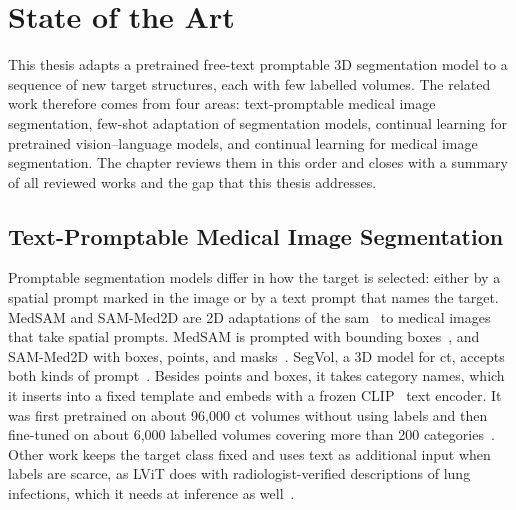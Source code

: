 %
%

\chapter{State of the Art}
\label{chap:sota}

This thesis adapts a pretrained free-text promptable 3D segmentation model to a sequence of new target structures, each with few labelled volumes.
The related work therefore comes from four areas: text-promptable medical image segmentation, few-shot adaptation of segmentation models, continual learning for pretrained vision--language models, and continual learning for medical image segmentation.
The chapter reviews them in this order and closes with a summary of all reviewed works and the gap that this thesis addresses.

\section{Text-Promptable Medical Image Segmentation}
\label{sec:text-promptable-seg}

Promptable segmentation models differ in how the target is selected: either by a spatial prompt marked in the image or by a text prompt that names the target.
MedSAM and SAM-Med2D are 2D adaptations of the \gls{sam}~\cite{Kirillov_2023_ICCV} to medical images that take spatial prompts.
MedSAM is prompted with bounding boxes~\cite{Ma_2024}, and SAM-Med2D with boxes, points, and masks~\cite{cheng2023sammed2d}.
SegVol, a 3D model for \gls{ct}, accepts both kinds of prompt~\cite{du2025segvoluniversalinteractivevolumetric}.
Besides points and boxes, it takes category names, which it inserts into a fixed template and embeds with a frozen CLIP~\cite{radford2021learningtransferablevisualmodels} text encoder.
It was first pretrained on about 96{,}000 \gls{ct} volumes without using labels and then fine-tuned on about 6{,}000 labelled volumes covering more than 200 categories~\cite{du2025segvoluniversalinteractivevolumetric}.
Other work keeps the target class fixed and uses text as additional input when labels are scarce, as LViT does with radiologist-verified descriptions of lung infections, which it needs at inference as well~\cite{li2023lvitlanguagemeetsvision}.

